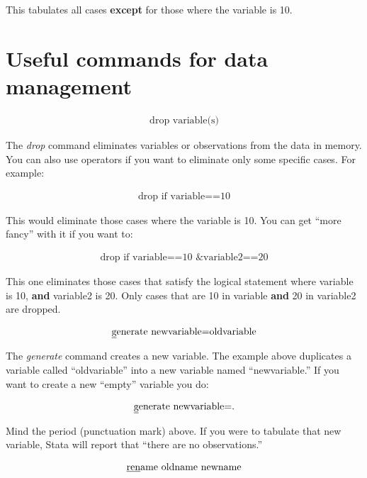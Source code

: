 \documentclass[paper=a4, fontsize=11pt]{scrartcl} %
\numberwithin{equation}{section} %
\numberwithin{figure}{section} %
\numberwithin{table}{section} %
\begin{document}
This tabulates all cases \textbf{except} for those where the variable is 10.


\section{Useful commands for data management}

\begin{align}
	\text{drop variable(s)}
\end{align}

The \textit{drop} command eliminates variables or observations from the data in memory. You can also use operators if you want to eliminate only some specific cases. For example:

\begin{align}
\text{drop if variable==10}
\end{align}

This would eliminate those cases where the variable is 10. You can get “more fancy” with it if you want to:

\begin{align}
\text{drop if variable==10 \& variable2==20}
\end{align}

This one eliminates those cases that satisfy the logical statement where variable is 10, \textbf{and} variable2 is 20. Only cases that are 10 in variable \textbf{and} 20 in variable2 are dropped.

\begin{align}
\text{\underline{g}enerate newvariable=oldvariable}
\end{align}

The \textit{\underline{g}enerate} command creates a new variable. The example above duplicates a variable called ``oldvariable'' into a new variable named ``newvariable.'' If you want to create a new ``empty'' variable you do:

\begin{align}
\text{\underline{g}enerate newvariable=.}
\end{align}

Mind the period (punctuation mark) above. If you were to tabulate that new variable, Stata will report that ``there are no observations.''

\begin{align}
\text{\underline{ren}ame oldname newname}
\end{align}
\end{document}
